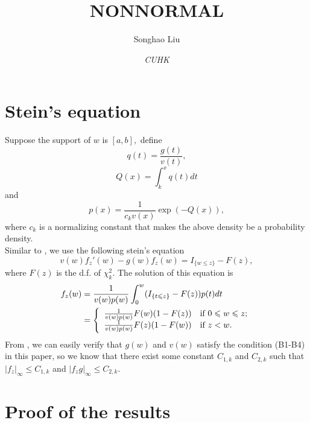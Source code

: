 \documentclass[a4paper,11pt,draft]{article}
\makeatletter
\def\cite{\citet}
\numberwithin{equation}{section}
\theoremstyle{plain}
\theoremstyle{definition}
\theoremstyle{remark}
\let\original@left\left
\let\original@right\right
\renewcommand{\left}{\mathopen{}\mathclose\bgroup\original@left}
\renewcommand{\right}{\aftergroup\egroup\original@right}
\renewcommand{\leq}{\leqslant}
\makeatother
\begin{document}
\title{\sc\bf\large\MakeUppercase{nonnormal}}
\author{\sc Songhao Liu}

\date{\itshape CUHK}

\maketitle
\section{Stein's equation} 
Suppose the support of $w$ is $[a,b],$ define
\begin{equation}\label{s6}
  q(t)=\frac{g(t)}{v(t)},
\end{equation}
\begin{equation}\label{s3}
  Q(x)=\int_{k}^{x}q(t)dt
\end{equation}
and 
\begin{equation}\label{s4}
  p(x)=\frac{1}{c_kv(x)}\exp(-Q(x)),
\end{equation}
where $c_k$ is a normalizing constant that makes the above density be a probability density.\\ 

\indent Similar to \cite{Shao2016}, we use the following stein's equation
\begin{equation}\label{s1}
	v(w)f_{z}'(w)-g(w)f_{z}(w)=I_{\{w\leq z\}}-F(z),
\end{equation}
where $F(z)$ is the d.f. of $\chi^2_{k}$. The solution of this equation is
\begin{equation}
\begin{aligned}
	f_{z}(w)&=\frac{1}{v(w)p(w)}\int_{0}^{w}(I_{\{t\leq z\}}-F(z))p(t)dt\\
&=\left\{
      \begin{array}{ll}
        \frac{1}{v(w)p(w)}F(w)(1-F(z))& \hbox{if $0\leq w\leq z$;} \\
        \frac{1}{v(w)p(w)}F(z)(1-F(w))& \hbox{if $z< w $.} \\
      \end{array}
    \right.
\end{aligned}
\end{equation}
From \cite{Shao2016}, we can easily verify that $g(w)$ and $v(w)$ satisfy the condition (B1-B4) in
this paper, so we know that there exist some constant $C_{1,k}$ and $C_{2,k}$ such that $|f_{z}|_\infty\leq C_{1,k}$
and $|f_{z}g|_\infty\leq C_{2,k}$.  
\section{Proof of the results}
\end{document}
